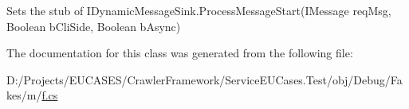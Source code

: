 Sets the stub of I\-Dynamic\-Message\-Sink.\-Process\-Message\-Start(\-I\-Message req\-Msg, Boolean b\-Cli\-Side, Boolean b\-Async)



The documentation for this class was generated from the following file\-:\begin{DoxyCompactItemize}
\item 
D\-:/\-Projects/\-E\-U\-C\-A\-S\-E\-S/\-Crawler\-Framework/\-Service\-E\-U\-Cases.\-Test/obj/\-Debug/\-Fakes/m/\hyperlink{m_2f_8cs}{f.\-cs}\end{DoxyCompactItemize}
